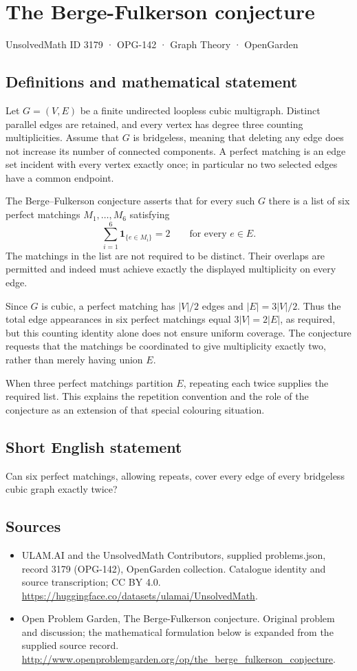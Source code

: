 \documentclass[11pt,a4paper]{article}
\begin{document}
\section*{The Berge-Fulkerson conjecture}\label{3179}
{\small UnsolvedMath ID 3179 · OPG-142 · Graph Theory · OpenGarden}
\subsection{Definitions and mathematical statement}
Let $G=(V,E)$ be a finite undirected loopless cubic
multigraph. Distinct parallel edges are retained, and
every vertex has degree three counting multiplicities.
Assume that $G$ is bridgeless, meaning that deleting any
edge does not increase its number of connected components.
A perfect matching is an edge set incident with every
vertex exactly once; in particular no two selected edges
have a common endpoint.

The Berge--Fulkerson conjecture asserts that for every
such $G$ there is a list of six perfect matchings
$M_1,\ldots,M_6$ satisfying
\[
 \sum_{i=1}^6\mathbf1_{\{e\in M_i\}}=2
 \qquad\text{for every }e\in E.
\]
The matchings in the list are not required to be distinct.
Their overlaps are permitted and indeed must achieve
exactly the displayed multiplicity on every edge.

Since $G$ is cubic, a perfect matching has $|V|/2$ edges
and $|E|=3|V|/2$. Thus the total edge appearances in six
perfect matchings equal $3|V|=2|E|$, as required, but
this counting identity alone does not ensure uniform
coverage. The conjecture requests that the matchings be
coordinated to give multiplicity exactly two, rather than
merely having union $E$.

When three perfect matchings partition $E$, repeating
each twice supplies the required list. This explains the
repetition convention and the role of the conjecture as
an extension of that special colouring situation.
\subsection{Short English statement}
Can six perfect matchings, allowing repeats, cover every edge of every bridgeless cubic graph exactly twice?
\subsection{Sources}
\begin{itemize}
\item[S1] ULAM.AI and the UnsolvedMath Contributors, supplied problems.json, record 3179 (OPG-142), OpenGarden collection. Catalogue identity and source transcription; CC BY 4.0.
\url{https://huggingface.co/datasets/ulamai/UnsolvedMath}.
\item[S2] Open Problem Garden, The Berge-Fulkerson conjecture. Original problem and discussion; the mathematical formulation below is expanded from the supplied source record.
\url{http://www.openproblemgarden.org/op/the_berge_fulkerson_conjecture}.
\end{itemize}
\end{document}
